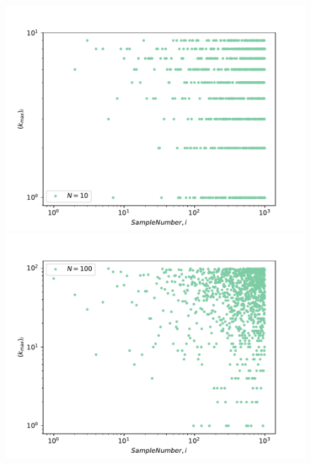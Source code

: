 \documentclass{article}
\begin{document}
\begin{figure}[H]

\begin{minipage}{0.47\textwidth}
    \includegraphics[width=\linewidth]{Q06/kmaxVsSampleNumber_N10.pdf}
    \end{minipage}
    \hspace{\fill} %
    \begin{minipage}{0.47\textwidth}
    \includegraphics[width=\linewidth]{Q06/kmaxVsSampleNumber_N100.pdf}
    \end{minipage}

    \vspace*{0.20cm} %


\end{figure}
\end{document}
